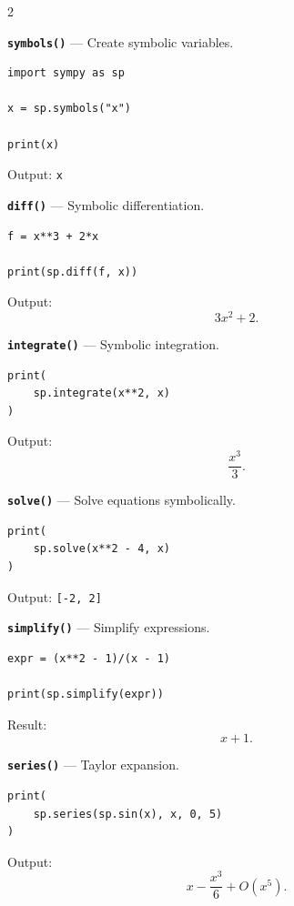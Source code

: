 \documentclass[10pt,a4paper]{article}
\begin{document}
\begin{multicols}{2}
\begin{card}
\textbf{\texttt{symbols()}} --- Create symbolic variables.

\begin{lstlisting}[style=pythonstyle]
import sympy as sp

x = sp.symbols("x")

print(x)
\end{lstlisting}

Output: \texttt{x}
\end{card}

\begin{card}
\textbf{\texttt{diff()}} --- Symbolic differentiation.

\begin{lstlisting}[style=pythonstyle]
f = x**3 + 2*x

print(sp.diff(f, x))
\end{lstlisting}

Output:
\[
3x^2+2.
\]
\end{card}

\begin{card}
\textbf{\texttt{integrate()}} --- Symbolic integration.

\begin{lstlisting}[style=pythonstyle]
print(
    sp.integrate(x**2, x)
)
\end{lstlisting}

Output:
\[
\frac{x^3}{3}.
\]
\end{card}

\begin{card}
\textbf{\texttt{solve()}} --- Solve equations symbolically.

\begin{lstlisting}[style=pythonstyle]
print(
    sp.solve(x**2 - 4, x)
)
\end{lstlisting}

Output:
\texttt{[-2, 2]}
\end{card}

\begin{card}
\textbf{\texttt{simplify()}} --- Simplify expressions.

\begin{lstlisting}[style=pythonstyle]
expr = (x**2 - 1)/(x - 1)

print(sp.simplify(expr))
\end{lstlisting}

Result:
\[
x+1.
\]
\end{card}

\begin{card}
\textbf{\texttt{series()}} --- Taylor expansion.

\begin{lstlisting}[style=pythonstyle]
print(
    sp.series(sp.sin(x), x, 0, 5)
)
\end{lstlisting}

Output:
\[
x-\frac{x^3}{6}+O(x^5).
\]
\end{card}


\end{multicols}
\end{document}
